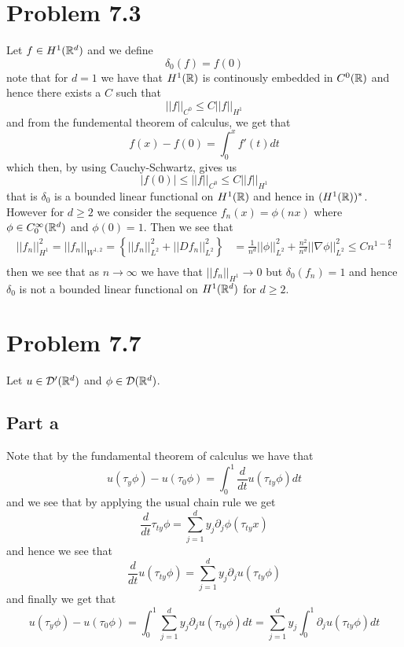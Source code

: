 \documentclass[12pt]{report}
\newcommand{\norm}[1]{\left|\left|#1\right|\right|}
\begin{document}
\section*{Problem 7.3}
Let $f \in H^1(\mathbb{R}^d)$ and we define 
\begin{equation*}
  \delta_0(f) = f(0)
\end{equation*}
note that for $d = 1$ we have that $H^1(\mathbb{R})$ is continously embedded in $C^0(\mathbb{R})$ and hence there exists a $C$ such that
\begin{equation*}
  \norm{f}_{C^0} \leq C \norm{f}_{H^1}
\end{equation*}
and from the fundemental theorem of calculus, we get that
\begin{equation*}
f(x) - f(0) = \int_0^x f'(t) dt
\end{equation*}
which then, by using Cauchy-Schwartz, gives us 
\begin{equation*}
  |f(0)| \leq \norm{f}_{C^0} \leq C \norm{f}_{H^1}
\end{equation*}
that is $\delta_0$ is a bounded linear functional on $H^1(\mathbb{R})$ and hence in $(H^1(\mathbb{R}))^*$. However for $d \geq 2$ we consider the sequence $f_n(x) = \phi(nx)$ where $\phi \in C_0^\infty(\mathbb{R}^d)$ and $\phi(0) = 1$. Then we see that 
\begin{align*}
  \norm{f_n}^2_{H^1} = \norm{f_n}_{W^{1,2}} = \left\{ \norm{f_n}^2_{L^2} + \norm{Df_n}^2_{L^2}\right\} &= \frac{1}{n^d} \norm{\phi}^2_{L^2} + \frac{n^2}{n^d} \norm{\nabla \phi}^2_{L^2} \leq C n^{1 - \frac{d}{2}}\\ 
\end{align*}
then we see that as $n \to \infty$ we have that $\norm{f_n}_{H^1} \to 0$ but $\delta_0(f_n) = 1$ and hence $\delta_0$ is not a bounded linear functional on $H^1(\mathbb{R}^d)$ for $d \geq 2$.

\section*{Problem 7.7}
Let $u \in \mathcal{D}'(\mathbb{R}^d)$ and $\phi \in \mathcal{D}(\mathbb{R}^d)$. 

\subsection*{Part a}
Note that by the fundamental theorem of calculus we have that
\begin{equation*}
  u(\tau_{y}\phi) - u(\tau_0 \phi) = \int_0^1 \frac{d}{dt} u(\tau_{ty}\phi) dt 
\end{equation*}
and we see that by applying the usual chain rule we get
\begin{equation*}
  \frac{d}{dt} \tau_{ty}\phi = \sum_{j=1}^d y_j \partial_j \phi(\tau_{ty}x) 
\end{equation*}
and hence we see that
\begin{equation*}
  \frac{d}{dt} u(\tau_{ty}\phi) = \sum_{j=1}^d y_j \partial_j u(\tau_{ty}\phi)
\end{equation*}
and finally we get that
\begin{equation*}
  u(\tau_{y}\phi) - u(\tau_0 \phi) = \int_0^1 \sum_{j=1}^d y_j \partial_j u(\tau_{ty}\phi) dt = \sum_{j=1}^d y_j \int_0^1 \partial_j u(\tau_{ty}\phi) dt
\end{equation*}
\end{document}

